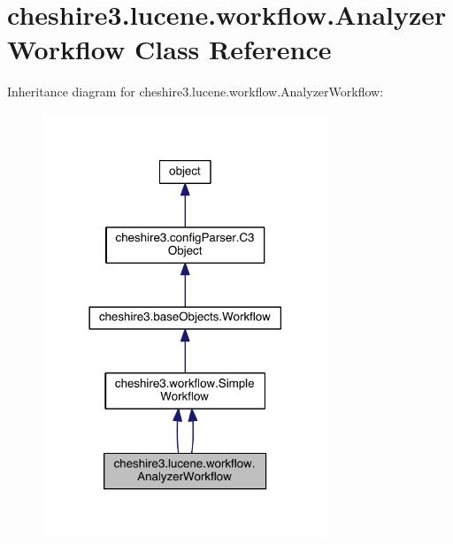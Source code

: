 \hypertarget{classcheshire3_1_1lucene_1_1workflow_1_1_analyzer_workflow}{\section{cheshire3.\-lucene.\-workflow.\-Analyzer\-Workflow Class Reference}
\label{classcheshire3_1_1lucene_1_1workflow_1_1_analyzer_workflow}
}


Inheritance diagram for cheshire3.\-lucene.\-workflow.\-Analyzer\-Workflow\-:
\nopagebreak
\begin{figure}[H]
\begin{center}
\leavevmode
\includegraphics[width=242pt]{classcheshire3_1_1lucene_1_1workflow_1_1_analyzer_workflow__inherit__graph}
\end{center}
\end{figure}


